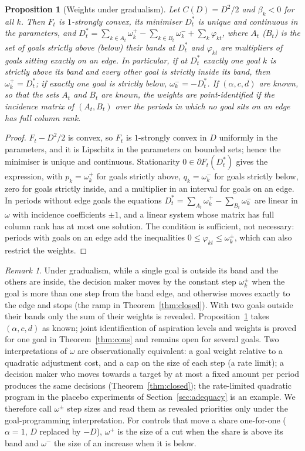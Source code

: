 \documentclass[11pt,a4paper]{article}
\newtheorem{proposition}{Proposition}
\theoremstyle{remark}\newtheorem{remark}{Remark}
\begin{document}
\begin{proposition}[Weights under gradualism]\label{prop:quad}
Let $C(D)=D^2/2$ and $\beta_k<0$ for all $k$. Then $F_t$ is $1$-strongly convex, its minimiser $D^*_t$ is unique and continuous in the parameters, and $D^*_t=\sum_{k\in A_t}\omega_k^+-\sum_{k\in B_t}\omega_k^-+\sum_k\varphi_{kt}$, where $A_t$ ($B_t$) is the set of goals strictly above (below) their bands at $D^*_t$ and $\varphi_{kt}$ are multipliers of goals sitting exactly on an edge. In particular, if at $D^*_t$ exactly one goal $k$ is strictly above its band and every other goal is strictly inside its band, then $\omega_k^+=D^*_t$; if exactly one goal is strictly below, $\omega_k^-=-D^*_t$. If $(\alpha,c,d)$ are known, so that the sets $A_t$ and $B_t$ are known, the weights are point-identified if the incidence matrix of $(A_t,B_t)$ over the periods in which no goal sits on an edge has full column rank.
\end{proposition}
\begin{proof}
$F_t-D^2/2$ is convex, so $F_t$ is $1$-strongly convex in $D$ uniformly in the parameters, and it is Lipschitz in the parameters on bounded sets; hence the minimiser is unique and continuous. Stationarity $0\in\partial F_t(D^*_t)$ gives the expression, with $p_k=\omega_k^+$ for goals strictly above, $q_k=\omega_k^-$ for goals strictly below, zero for goals strictly inside, and a multiplier in an interval for goals on an edge. In periods without edge goals the equations $D^*_t=\sum_{A_t}\omega_k^+-\sum_{B_t}\omega_k^-$ are linear in $\omega$ with incidence coefficients $\pm1$, and a linear system whose matrix has full column rank has at most one solution. The condition is sufficient, not necessary: periods with goals on an edge add the inequalities $0\le\varphi_{kt}\le\omega_k^\pm$, which can also restrict the weights.
\end{proof}
\begin{remark}
Under gradualism, while a single goal is outside its band and the others are inside, the decision maker moves by the constant step $\omega_k^\pm$ when the goal is more than one step from the band edge, and otherwise moves exactly to the edge and stops (the ramp in Theorem~\ref{thm:closed}). With two goals outside their bands only the sum of their weights is revealed. Proposition~\ref{prop:quad} takes $(\alpha,c,d)$ as known; joint identification of aspiration levels and weights is proved for one goal in Theorem~\ref{thm:cons} and remains open for several goals. Two interpretations of $\omega$ are observationally equivalent: a goal weight relative to a quadratic adjustment cost, and a cap on the size of each step (a rate limit); a decision maker who moves towards a target by at most a fixed amount per period produces the same decisions (Theorem~\ref{thm:closed}); the rate-limited quadratic program in the placebo experiments of Section~\ref{sec:adequacy} is an example. We therefore call $\omega^\pm$ step sizes and read them as revealed priorities only under the goal-programming interpretation. For controls that move a share one-for-one ($\alpha=1$, $D$ replaced by $-D$), $\omega^+$ is the size of a cut when the share is above its band and $\omega^-$ the size of an increase when it is below.
\end{remark}
\end{document}
